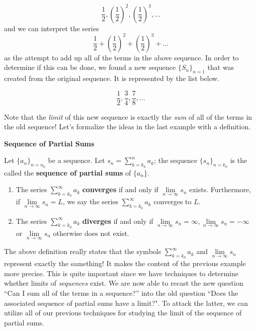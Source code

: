 \documentclass{ximera}
\begin{document}
\[
\frac{1}{2},\left(\frac{1}{2}\right)^2,\left(\frac{1}{2}\right)^3,\ldots
\]
and we can interpret the series $$\frac{1}{2} + \left(\frac{1}{2}\right)^2+ \left(\frac{1}{2}\right)^3+ \ldots$$ as the attempt to add up all of the terms in the above sequence.  In order to determine if this can be done, we found a new sequence $\{S_n\}_{n=1}$ that was created from the original sequence.  It is represented by the list below.

\[
\frac{1}{2},\frac{3}{4},\frac{7}{8},\ldots
\]

Note that the \emph{limit} of this new sequence is exactly the \emph{sum} of all of the terms in the old sequence!  Let's formalize the ideas in the last example with a definition.









\begin{definition}  \textbf{\textcolor{green!50!black}{Sequence of Partial Sums}} 


Let $\{a_n\}_{n=n_0}$ be a sequence.  Let $s_n = \sum\limits_{k=k_0}^n a_k$; the sequence $\{s_n\}_{n=k_0}$ is the called the
  \textbf{sequence of partial sums} of $\{a_n\}$.  

\begin{enumerate}
\item The series $\sum\limits_{k=k_0}^\infty a_k$ \textbf{converges} if and only if $\lim\limits_{n\to\infty} s_n$ exists.  Furthermore, if $\lim\limits_{n\to\infty} s_n =L$, we say the series $\sum\limits_{k=k_0}^\infty a_k$ converges to $L$. 
\item The series $\sum\limits_{k=k_0}^\infty a_k$ \textbf{diverges} if and only if $\lim\limits_{n\to\infty} s_n = \infty, \lim\limits_{n\to\infty} s_n = -\infty$ or $\lim\limits_{n\to\infty} s_n $ otherwise does not exist.  
\end{enumerate}
\end{definition}








The above definition really states that the symbols $\sum\limits_{k=k_0}^{\infty} a_k$ and $\lim\limits_{n \to \infty} s_n$ represent exactly the samething! It makes the content of the previous example more precise.  This is quite important since we have techniques to determine whether limits of \emph{sequences} exist.  We are now able to recast the new question ``Can I sum all of the terms in a sequence?'' into the old question ``Does the associated sequence of partial sums have a limit?".  To attack the latter, we can utilize all of our previous techniques for studying the limit of the sequence of partial sums.
\end{document}

